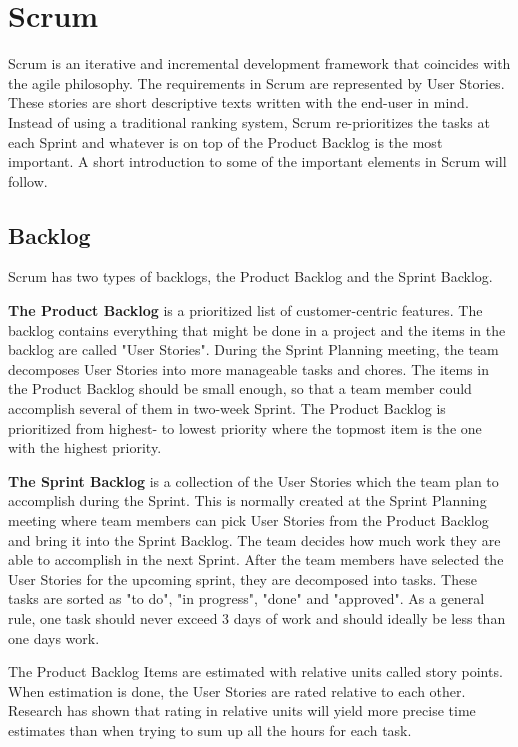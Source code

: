 \chapter{Scrum}
Scrum is an iterative and incremental development framework that coincides with the agile philosophy. The requirements in Scrum are represented by User Stories. These stories are short descriptive texts written with the end-user in mind. Instead of using a traditional ranking system, Scrum re-prioritizes the tasks at each Sprint and whatever is on top of the Product Backlog is the most important. A short introduction to some of the important elements in Scrum will follow. 

\section{Backlog}
Scrum has two types of backlogs, the Product Backlog and the Sprint Backlog.\bigskip

\textbf{The Product Backlog} is a prioritized list of customer-centric features. The backlog contains everything that might be done in a project and the items in the backlog are called "User Stories". During the Sprint Planning meeting, the team decomposes User Stories into more manageable tasks and chores. The items in the Product Backlog should be small enough, so that a team member could accomplish several of them in two-week Sprint. The Product Backlog is prioritized from highest- to lowest priority where the topmost item is the one with the highest priority. \bigskip

\textbf{The Sprint Backlog} is a collection of the User Stories which the team plan to accomplish during the Sprint. This is normally created at the Sprint Planning meeting where team members can pick User Stories from the Product Backlog and bring it into the Sprint Backlog. The team decides how much work they are able to accomplish in the next Sprint. After the team members have selected the User Stories for the upcoming sprint, they are decomposed into tasks. These tasks are sorted as "to do", "in progress", "done" and "approved". As a general rule, one task should never exceed 3 days of work and should ideally be less than one days work.\bigskip 

The Product Backlog Items are estimated with relative units called story points. When estimation is done, the User Stories are rated relative to each other. Research has shown that rating in relative units will yield more precise time estimates than when trying to sum up all the hours for each task. 

